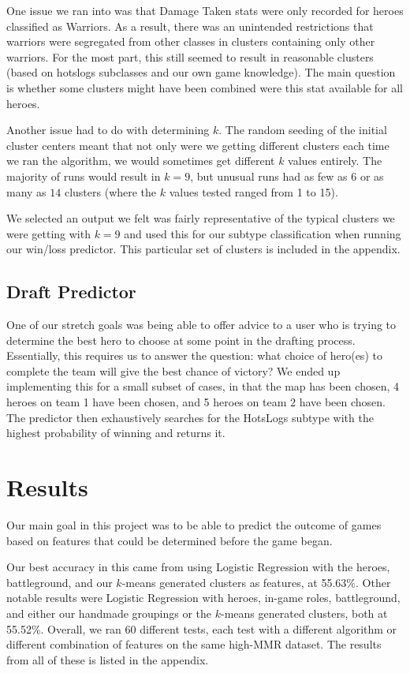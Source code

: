 \documentclass[11pt,letterpaper]{article}
\begin{document}
One issue we ran into was that Damage Taken stats were only recorded for heroes classified as Warriors. As a result, there was an unintended restrictions that warriors were segregated from other classes in clusters containing only other warriors. For the most part, this still seemed to result in reasonable clusters (based on hotslogs subclasses and our own game knowledge). The main question is whether some clusters might have been combined were this stat available for all heroes.

Another issue had to do with determining $k$. The random seeding of the initial cluster centers meant that not only were we getting different clusters each time we ran the algorithm, we would sometimes get different $k$ values entirely. The majority of runs would result in $k = 9$, but unusual runs had as few as $6$ or as many as $14$ clusters (where the $k$ values tested ranged from 1 to 15).

We selected an output we felt was fairly representative of the typical clusters we were getting with $k = 9$ and used this for our subtype classification when running our win/loss predictor. This particular set of clusters is included in the appendix.

\subsection{Draft Predictor}
One of our stretch goals was being able to offer advice to a user who is trying to determine the best hero to choose at some point in the drafting process. Essentially, this requires us to answer the question: what choice of hero(es) to complete the team will give the best chance of victory? We ended up implementing this for a small subset of cases, in that the map has been chosen, 4 heroes on team 1 have been chosen, and 5 heroes on team 2 have been chosen. The predictor then exhaustively searches for the HotsLogs subtype with the highest probability of winning and returns it.

\section{Results}

Our main goal in this project was to be able to predict the outcome of games based on features that could be determined before the game began. 

Our best accuracy in this came from using Logistic Regression with the heroes, battleground, and our $k$-means generated clusters as features, at 55.63\%. Other notable results were Logistic Regression with heroes, in-game roles, battleground, and either our handmade groupings or the $k$-means generated clusters, both at 55.52\%. Overall, we ran 60 different tests, each test with a different algorithm or different combination of features on the same high-MMR dataset. The results from all of these is listed in the appendix.
\end{document}
